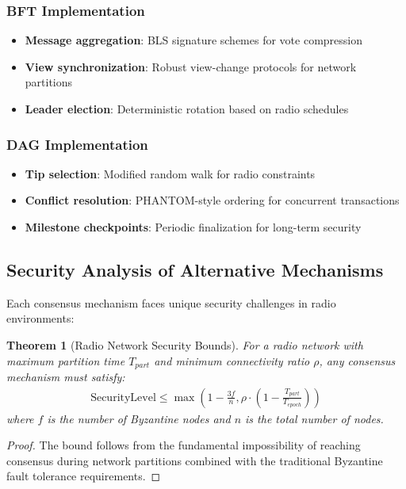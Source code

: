 \documentclass[11pt,a4paper]{article}
\newtheorem{theorem}{Theorem}[section]
\begin{document}
\subsubsection{BFT Implementation}

\begin{itemize}
\item \textbf{Message aggregation}: BLS signature schemes for vote compression
\item \textbf{View synchronization}: Robust view-change protocols for network partitions
\item \textbf{Leader election}: Deterministic rotation based on radio schedules
\end{itemize}

\subsubsection{DAG Implementation}

\begin{itemize}
\item \textbf{Tip selection}: Modified random walk for radio constraints
\item \textbf{Conflict resolution}: PHANTOM-style ordering for concurrent transactions
\item \textbf{Milestone checkpoints}: Periodic finalization for long-term security
\end{itemize}

\subsection{Security Analysis of Alternative Mechanisms}

Each consensus mechanism faces unique security challenges in radio environments:

\begin{theorem}[Radio Network Security Bounds]
For a radio network with maximum partition time $T_{part}$ and minimum connectivity ratio $\rho$, any consensus mechanism must satisfy:
\begin{align}
\text{SecurityLevel} \leq \max\left(1 - \frac{3f}{n}, \rho \cdot \left(1 - \frac{T_{part}}{T_{epoch}}\right)\right)
\end{align}
where $f$ is the number of Byzantine nodes and $n$ is the total number of nodes.
\end{theorem}

\begin{proof}
The bound follows from the fundamental impossibility of reaching consensus during network partitions combined with the traditional Byzantine fault tolerance requirements.
\end{proof}
\end{document}
